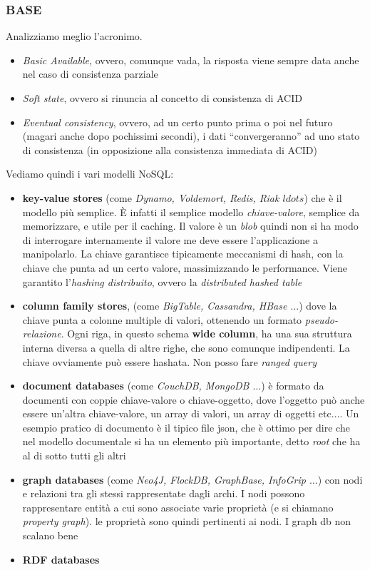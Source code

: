 \documentclass[a4paper,12pt, oneside]{book}
\begin{document}
\subsubsection{BASE}
Analizziamo meglio l'acronimo.
\begin{itemize}
  \item \textit{Basic Available}, ovvero, comunque vada, la risposta viene
  sempre data anche nel caso di consistenza parziale
  \item \textit{Soft state}, ovvero si rinuncia al concetto di consistenza di
  ACID
  \item \textit{Eventual consistency}, ovvero, ad un certo punto prima o poi
  nel futuro (magari anche dopo pochissimi secondi),
  i dati ``convergeranno'' ad uno stato di consistenza (in opposizione alla
  consistenza immediata di ACID)
\end{itemize}
Vediamo quindi i vari modelli NoSQL:
\begin{itemize}
  \item \textbf{key-value stores} (come \textit{Dynamo, Voldemort, Redis, Riak
    $ldots$}) che è il modello più semplice. È infatti il semplice modello
  \textit{chiave-valore}, semplice da memorizzare, e utile per il caching. Il
  valore è un \textit{blob} quindi non si ha modo di interrogare internamente il
  valore me deve essere l'applicazione a manipolarlo. La chiave garantisce
  tipicamente meccanismi di hash, con la chiave che punta ad un certo
  valore, massimizzando le performance. Viene garantito l'\textit{hashing
    distribuito}, ovvero la \textit{distributed hashed table}
  \item \textbf{column family stores}, (come
  \textit{BigTable, Cassandra, HBase $\ldots$}) dove la chiave punta a colonne
  multiple di valori, ottenendo un formato \textit{pseudo-relazione}. Ogni riga,
  in questo schema \textbf{wide column}, ha una sua struttura interna diversa a
  quella di altre righe, che sono comunque indipendenti. La chiave ovviamente
  può essere hashata. Non posso fare \textit{ranged query}
  \item \textbf{document databases} (come \textit{CouchDB, MongoDB $\ldots$}) è
  formato da documenti con coppie chiave-valore o chiave-oggetto, dove l'oggetto
  può anche essere un'altra chiave-valore, un array di valori, un array di
  oggetti etc$\ldots$. Un esempio pratico di documento è il tipico file json,
  che è ottimo per dire che nel modello documentale si ha un elemento più
  importante, detto \textit{root} che ha al di sotto tutti gli altri
  \item \textbf{graph databases} (come \textit{Neo4J, FlockDB, GraphBase,
    InfoGrip $\ldots$}) con nodi e relazioni tra gli stessi rappresentate dagli
  archi. I nodi possono rappresentare entità a cui sono associate varie
  proprietà (e si chiamano \textit{property graph}). le proprietà sono quindi
  pertinenti ai nodi. I graph db non scalano bene
  \item \textbf{RDF databases}
\end{itemize}
\end{document}
